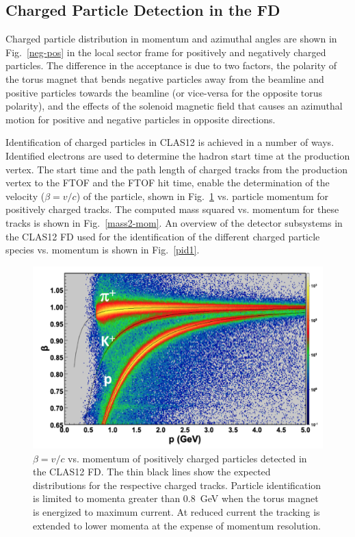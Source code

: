 \documentclass[final,3p,twocolumn]{elsarticle}
\begin{document}
\subsection{Charged Particle Detection in the FD}
 
Charged particle distribution in momentum and azimuthal angles are shown in Fig.~\ref{neg-pos} in the local sector
frame for positively and negatively charged particles. The difference in the acceptance is due to two factors, the
polarity of the torus magnet that bends negative particles away from the beamline and positive particles towards
the beamline (or vice-versa for the opposite torus polarity), and the effects of the solenoid magnetic field that
causes an azimuthal motion for positive and negative particles in opposite directions. 


Identification of charged particles in CLAS12 is achieved in a number of ways. Identified electrons are used
to determine the hadron start time at the production vertex. The start time and the path length of charged
tracks from the production vertex to the FTOF and the FTOF hit time, enable the determination of the
velocity ($\beta = v/c$) of the particle, shown in Fig.~\ref{pid} vs. particle momentum for positively charged
tracks. The computed mass squared vs. momentum for these tracks is shown in Fig.~\ref{mass2-mom}. An
overview of the detector subsystems in the CLAS12 FD used for the identification of the different charged
particle species vs. momentum is shown in Fig.~\ref{pid1}. 

\begin{figure}[t!]
\centerline{\includegraphics[width=1.0\columnwidth]{FTOF1b_pid.png}}
\caption{$\beta = v/c $ vs. momentum of positively charged particles detected in the CLAS12 FD.
  The thin black lines show the expected distributions for the respective charged tracks. Particle identification
  is limited to momenta greater than 0.8~GeV when the torus magnet is energized to maximum current. At
  reduced current the tracking is extended to lower momenta at the expense of momentum resolution.}
\label{pid}
\end{figure} 
\end{document}
